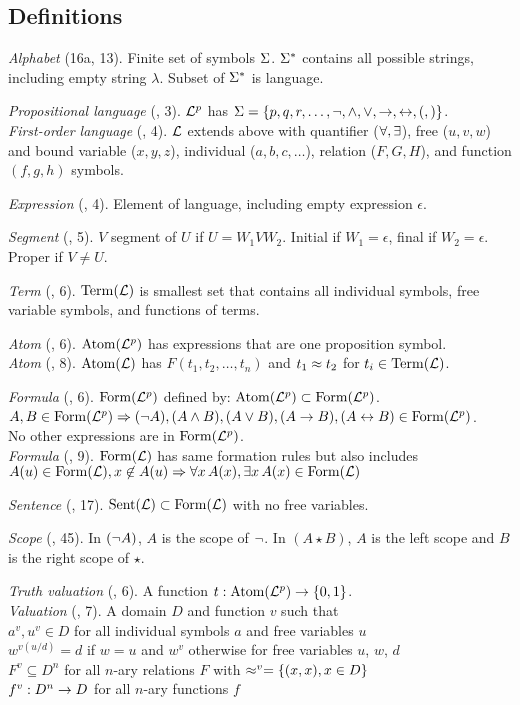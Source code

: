 \documentclass[class=cs245,nogeometry]{agony}
\newcommand{\dfn}[3]{\textit{#1} (\textsection #2, #3).}
\begin{document}
\pagebreak
\begin{multicols}{2}
  \section*{Definitions}

  \dfn{Alphabet}{16a}{13} Finite set of symbols $\S$.
  $\S^*$ contains all possible strings, including empty string $\lambda$.
  Subset of $\S^*$ is language.

  \dfn{Propositional language}{02}{3}
  $\Lp$ has $\S = \{p,q,r,\ldots,\n,\a,\o,\i,\e,(,)\}$. \\
  \dfn{First-order language}{11}{4}
  $\L$ extends above with quantifier ($\A,\X$),
  free ($u,v,w$) and bound variable ($x,y,z$), individual ($a,b,c,\dotsc$),
  relation ($F,G,H$), and function $(f,g,h)$ symbols.

  \dfn{Expression}{02}{4} Element of language, including empty expression $\epsilon$.

  \dfn{Segment}{02}{5} $V$ segment of $U$ if $U = W_1VW_2$.
  Initial if $W_1 = \epsilon$, final if $W_2 = \epsilon$.
  Proper if $V \neq U$.

  \dfn{Term}{11}{6} $\Term(\L)$ is smallest set that contains
  all individual symbols, free variable symbols, and functions of terms.

  \dfn{Atom}{02}{6} $\Atom(\Lp)$ has expressions that are one proposition symbol. \\
  \dfn{Atom}{11}{8} $\Atom(\L)$ has $F(t_1,t_2,\dotsc,t_n)$ and $t_1 \eq t_2$ for $t_i \in \Term(\L)$.

  \dfn{Formula}{02}{6}
  $\Form(\Lp)$ defined by: $\Atom(\Lp) \subset \Form(\Lp)$. \\
  $A,B\in\Form(\Lp) \Rarr (\n A), (A \a B), (A \o B), (A \i B), (A \e B) \in \Form(\Lp)$. \\
  No other expressions are in $\Form(\Lp)$. \\
  \dfn{Formula}{11}{9} $\Form(\L)$ has same formation rules but also includes
  $A(u)\in\Form(\L), x\not\in A(u) \Rarr \A[x]A(x), \X[x]A(x) \in \Form(\L)$

  \dfn{Sentence}{11}{17} $\Sent(\L) \subset \Form(\L)$ with no free variables.

  \dfn{Scope}{02}{45}
  In $(\n A)$, $A$ is the scope of $\n$.
  In $(A \star B)$, $A$ is the left scope and $B$ is the right scope of $\star$.

  \dfn{Truth valuation}{03}{6} A function $t : \Atom(\Lp)\i\{0,1\}$. \\
  \dfn{Valuation}{12}{7} A domain $D$ and function $v$ such that \\
  $a^v, u^v \in D$ for all individual symbols $a$ and free variables $u$ \\
  $w^{v(u/d)} = d$ if $w = u$ and $w^v$ otherwise for free variables $u$, $w$, $d$ \\
  $F^v \subseteq D^n$ for all $n$-ary relations $F$ with $\eq^v = \{(x,x),x\in D\}$ \\
  $f^v : D^n \i D$ for all $n$-ary functions $f$


\end{multicols}
\end{document}
